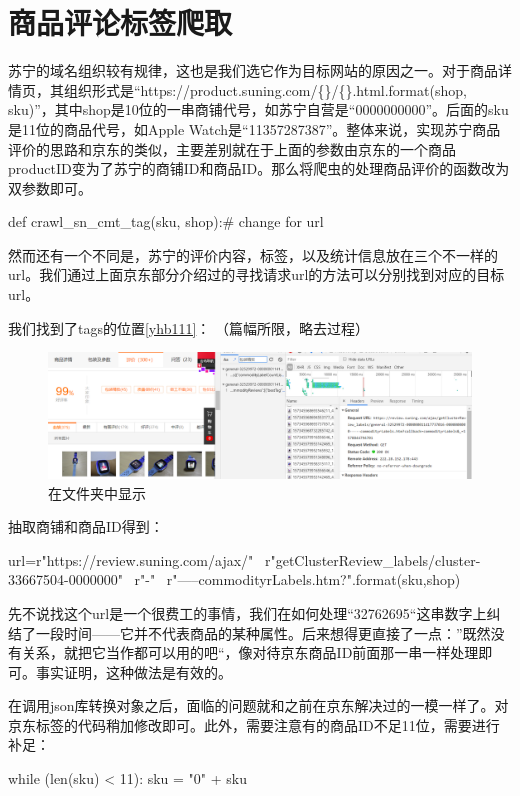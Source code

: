 \section{商品评论标签爬取}

苏宁的域名组织较有规律，这也是我们选它作为目标网站的原因之一。对于商品详情页，其组织形式是“https://product.suning.com/\{\}/\{\}.html.format(shop, sku)”，其中shop是10位的一串商铺代号，如苏宁自营是“0000000000”。后面的sku是11位的商品代号，如Apple Watch是“11357287387”。整体来说，实现苏宁商品评价的思路和京东的类似，主要差别就在于上面的参数由京东的一个商品productID变为了苏宁的商铺ID和商品ID。那么将爬虫的处理商品评价的函数改为双参数即可。
\begin{python}
def crawl_sn_cmt_tag(sku, shop):# change for url
\end{python}

然而还有一个不同是，苏宁的评价内容，标签，以及统计信息放在三个不一样的url。我们通过上面京东部分介绍过的寻找请求url的方法可以分别找到对应的目标url。

我们找到了tags的位置\ref{yhb111}：
（篇幅所限，略去过程）
\begin{figure}[htbp]
\centering
\includegraphics[width=13.5cm]{img/yhb/sn_eg2.png}
\caption{在文件夹中显示}
\label{img:yhb111}   %
\end{figure}

抽取商铺和商品ID得到：
\begin{python}
url=r"https://review.suning.com/ajax/" \
        r"getClusterReview_labels/cluster-33667504-0000000" \
        r"{}-{}" \
        r"-----commodityrLabels.htm?".format(sku,shop)
\end{python}


先不说找这个url是一个很费工的事情，我们在如何处理“32762695“这串数字上纠结了一段时间——它并不代表商品的某种属性。后来想得更直接了一点：”既然没有关系，就把它当作都可以用的吧“，像对待京东商品ID前面那一串一样处理即可。事实证明，这种做法是有效的。

在调用json库转换对象之后，面临的问题就和之前在京东解决过的一模一样了。对京东标签的代码稍加修改即可。此外，需要注意有的商品ID不足11位，需要进行补足：
\begin{python}
while (len(sku) < 11):
                sku = "0" + sku
\end{python}



